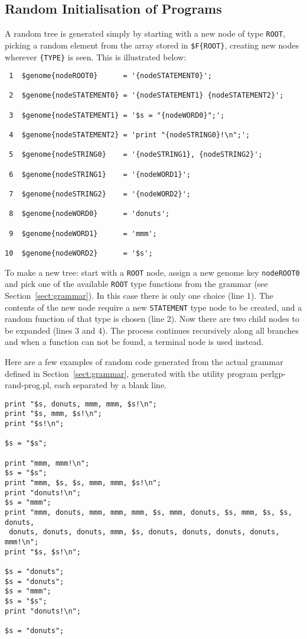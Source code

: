 \documentclass[a4paper]{article}
\begin{document}
\subsection{Random Initialisation of Programs}

A random tree is generated simply by starting with a new node of type
\texttt{ROOT}, picking a random element from the array stored in
\texttt{\$F\{ROOT\}}, creating new nodes wherever \texttt{\{TYPE\}} is seen.
This is illustrated below:


\begin{verbatim}
 1  $genome{nodeROOT0}      = '{nodeSTATEMENT0}';

 2  $genome{nodeSTATEMENT0} = '{nodeSTATEMENT1} {nodeSTATEMENT2}';

 3  $genome{nodeSTATEMENT1} = '$s = "{nodeWORD0}";';

 4  $genome{nodeSTATEMENT2} = 'print "{nodeSTRING0}!\n";';

 5  $genome{nodeSTRING0}    = '{nodeSTRING1}, {nodeSTRING2}';

 6  $genome{nodeSTRING1}    = '{nodeWORD1}';

 7  $genome{nodeSTRING2}    = '{nodeWORD2}';

 8  $genome{nodeWORD0}      = 'donuts';

 9  $genome{nodeWORD1}      = 'mmm';

10  $genome{nodeWORD2}      = '$s';
\end{verbatim}
\begin{center}\small
To make a new tree: start with a \texttt{ROOT}
node, assign a new genome key \texttt{nodeROOT0} and pick one of the
available \texttt{ROOT} type functions from the grammar (see
Section~\ref{sect:grammar}).  In this case there is only one choice
(line 1).  The contents of the new node require a new \texttt{STATEMENT} type
node to be created, and a random function of that type is chosen (line
2).  Now there are two child nodes to be expanded (lines 3 and 4).
The process continues recursively along all branches and when a
function can not be found, a terminal node is used instead.  
\end{center}


Here are a few examples of random code generated from the actual
grammar defined in Section~\ref{sect:grammar}, generated with the
utility program perlgp-rand-prog.pl, each separated by a blank line.

\begin{verbatim}
print "$s, donuts, mmm, mmm, $s!\n";
print "$s, mmm, $s!\n";
print "$s!\n";

$s = "$s";

print "mmm, mmm!\n";
$s = "$s";
print "mmm, $s, $s, mmm, mmm, $s!\n";
print "donuts!\n";
$s = "mmm";
print "mmm, donuts, mmm, mmm, mmm, $s, mmm, donuts, $s, mmm, $s, $s, donuts,
 donuts, donuts, donuts, mmm, $s, donuts, donuts, donuts, donuts, mmm!\n";
print "$s, $s!\n";

$s = "donuts";
$s = "donuts";
$s = "mmm";
$s = "$s";
print "donuts!\n";

$s = "donuts";
\end{verbatim}
\end{document}
